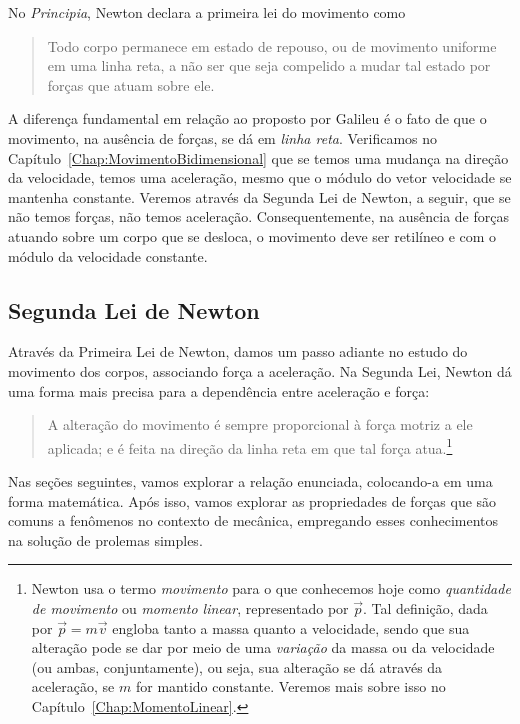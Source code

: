 No \emph{Principia}, Newton declara a primeira lei do movimento como
\begin{quote}
  Todo corpo permanece em estado de repouso, ou de movimento uniforme em uma linha reta, a não ser que seja compelido a mudar tal estado por forças que atuam sobre ele.
\end{quote}
%
A diferença fundamental em relação ao proposto por Galileu é o fato de que o movimento, na ausência de forças, se dá em \emph{linha reta}. Verificamos no Capítulo~\ref{Chap:MovimentoBidimensional} que se temos uma mudança na direção da velocidade, temos uma aceleração, mesmo que o módulo do vetor velocidade se mantenha constante. Veremos através da Segunda Lei de Newton, a seguir, que se não temos forças, não temos aceleração. Consequentemente, na ausência de forças atuando sobre um corpo que se desloca, o movimento deve ser retilíneo e com o módulo da velocidade constante.


\subsection{Segunda Lei de Newton}
\label{Sec:SegundaLeiDeNewton}

Através da Primeira Lei de Newton, damos um passo adiante no estudo do movimento dos corpos, associando força a aceleração. Na Segunda Lei, Newton dá uma forma mais precisa para a dependência entre aceleração e força:
\begin{quote}
  A alteração do movimento é sempre proporcional à força motriz a ele aplicada; e é feita na direção da linha reta em que tal força atua.\footnote{Newton usa o termo \emph{movimento} para o que conhecemos hoje como \emph{quantidade de movimento} ou \emph{momento linear}, representado por $\vec{p}$. Tal definição, dada por $\vec{p} = m\vec{v}$ engloba tanto a massa quanto a velocidade, sendo que sua alteração pode se dar por meio de uma \emph{variação} da massa ou da velocidade (ou ambas, conjuntamente), ou seja, sua alteração se dá através da aceleração, se $m$ for mantido constante. Veremos mais sobre isso no Capítulo~\ref{Chap:MomentoLinear}.}
\end{quote}

Nas seções seguintes, vamos explorar a relação enunciada, colocando-a em uma forma matemática. Após isso, vamos explorar as propriedades de forças que são comuns a fenômenos no contexto de mecânica, empregando esses conhecimentos na solução de prolemas simples.
 

